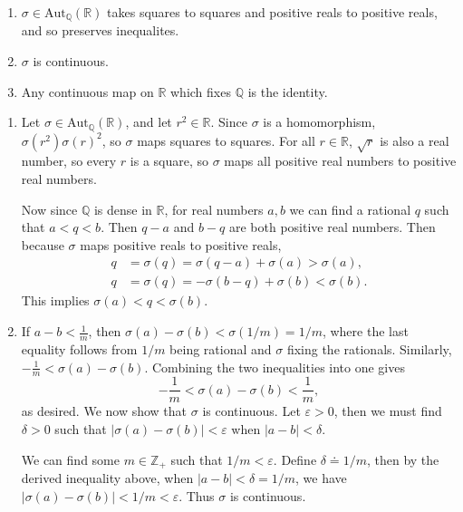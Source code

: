 \documentclass[10pt]{report}
\begin{document}

\begin{exer}[DF 14.1: 7.]
	\begin{enumerate}
		\item $\sigma \in \text{Aut}_{\mathbb{Q}}(\mathbb{R})$ takes squares to squares and positive reals to positive reals, and so preserves inequalites.
		\item $\sigma$ is continuous.
		\item Any continuous map on $\mathbb{R}$ which fixes $\mathbb{Q}$ is the identity.
	\end{enumerate}
\end{exer}
\begin{enumerate}
	\item Let $\sigma\in \text{Aut}_{\mathbb{Q}}(\mathbb{R})$, and let $r^2 \in \mathbb{R}$. Since $\sigma$ is a homomorphism, $\sigma(r^2)\sigma(r)^2$, so $\sigma$ maps squares to squares. For all $r \in \mathbb{R}$, $\sqrt{r} $ is also a real number, so every $r$ is a square, so $\sigma$ maps all positive real numbers to positive real numbers.

		Now since $\mathbb{Q}$ is dense in $\mathbb{R}$, for real numbers $a,b$ we can find a rational $q$ such that $a<q<b$. Then $q-a$ and $b-q$ are both positive real numbers. Then because $\sigma$ maps positive reals to positive reals,
		\begin{align*}
			q &= \sigma(q) = \sigma(q-a)+\sigma(a) > \sigma(a), \\
			q &= \sigma(q) = -\sigma(b-q)+\sigma(b) < \sigma(b).
		\end{align*}
		This implies $\sigma(a)<q<\sigma(b)$.

	\item If $a-b < \frac{1}{m} $, then $\sigma(a)-\sigma(b) < \sigma(1/m) = 1/m$, where the last equality follows from $1/m$ being rational and $\sigma$ fixing the rationals. Similarly, $-\frac{1}{m} < \sigma(a)-\sigma(b)$. Combining the two inequalities into one gives
		\[
			-\frac{1}{m} < \sigma(a)-\sigma(b) < \frac{1}{m},
		\] as desired. We now show that $\sigma$ is continuous. Let $\varepsilon>0$, then we must find $\delta>0$ such that $\left| \sigma(a)-\sigma(b) \right|<\varepsilon$ when $|a-b|<\delta$.

		We can find some $m \in \mathbb{Z}_{+}$ such that $1/m < \varepsilon$. Define $\delta \doteq 1/m$, then by the derived inequality above, when $|a-b| < \delta = 1/m$, we have $|\sigma(a)-\sigma(b)|< 1/m < \varepsilon$. Thus $\sigma$ is continuous.


\end{enumerate}
\end{document}
